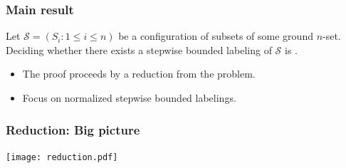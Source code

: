 \documentclass[unknownkeysallowed,11pt]{beamer}
\begin{document}
\begin{frame}
    \frametitle{Main result}

    \begin{theorem}
      Let $\mathcal{S} = (S_i : 1 \leq i \leq n)$ be a configuration of subsets of
      some ground $n$-set.
      Deciding whether there exists a stepwise bounded labeling of $\mathcal{S}$
      is \NPC.
    \end{theorem}

    \bigskip

    \begin{itemize}
      \item
      The proof proceeds by a reduction from the \NPcomplete {} problem.

      \item
      Focus on normalized stepwise bounded labelings.
    \end{itemize}

\end{frame}


\begin{frame}
    \frametitle{Reduction: Big picture}

    \begin{center}
      \texttt{[image: reduction.pdf]}
    \end{center}

\end{frame}

\end{document}
